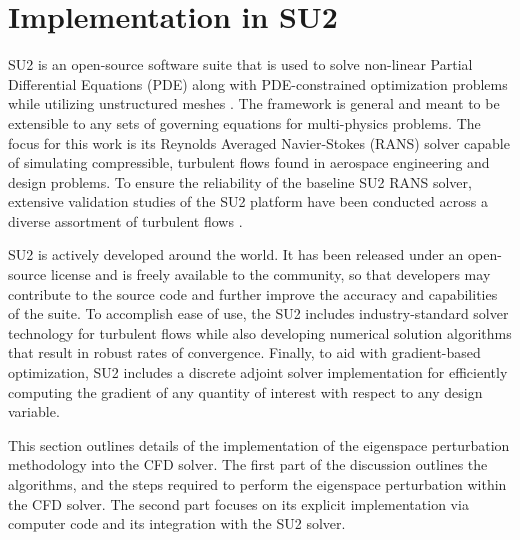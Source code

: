 \section{Implementation in SU2}

SU2 is an open-source software suite that is used to solve non-linear Partial Differential Equations (PDE) along with PDE-constrained optimization problems while utilizing unstructured meshes \cite{su21}. The framework is general and meant to be extensible to any sets of governing equations for multi-physics problems. The focus for this work is its Reynolds Averaged Navier-Stokes (RANS) solver capable of simulating compressible, turbulent flows found in aerospace engineering and design problems. To ensure the reliability of the baseline SU2 RANS solver, extensive validation studies of the SU2 platform have been conducted across a diverse assortment of turbulent flows \cite{su22}. 

SU2 is actively developed around the world. It has been released under an open-source license and is freely available to the community, so that developers may contribute to the source code and further improve the accuracy and capabilities of the suite. To accomplish ease of use, the SU2 includes industry-standard solver technology for turbulent flows while also developing numerical solution algorithms that result in robust rates of convergence. Finally, to aid with gradient-based optimization, SU2 includes a discrete adjoint solver implementation for efficiently computing the gradient of any quantity of interest with respect to any design variable.

This section outlines details of the implementation of the eigenspace perturbation methodology into the CFD solver. The first part of the discussion outlines the algorithms, and the steps required to perform the eigenspace perturbation within the CFD solver. The second part focuses on its explicit implementation via computer code and its integration with the SU2 solver. 

